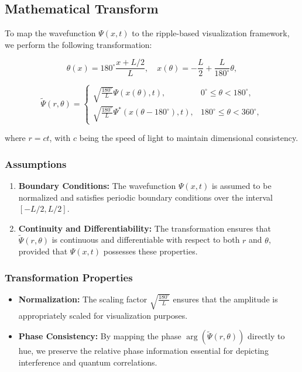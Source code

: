 \documentclass[12pt]{article}
\begin{document}
\subsection{Mathematical Transform}
To map the wavefunction \(\Psi(x,t)\) to the ripple-based visualization framework, we perform the following transformation:

\[
\theta(x) = 180^\circ \frac{x + L/2}{L}, \quad x(\theta) = -\frac{L}{2} + \frac{L}{180^\circ}\theta,
\]

\[
\tilde{\Psi}(r, \theta) = 
\begin{cases}
\sqrt{\frac{180^\circ}{L}} \Psi(x(\theta), t), & 0^\circ \leq \theta < 180^\circ, \\
\sqrt{\frac{180^\circ}{L}} \Psi^*(x(\theta - 180^\circ), t), & 180^\circ \leq \theta < 360^\circ,
\end{cases}
\]

where \(r = ct\), with \(c\) being the speed of light to maintain dimensional consistency.

\subsubsection{Assumptions}
\begin{enumerate}
    \item \textbf{Boundary Conditions:} The wavefunction \(\Psi(x,t)\) is assumed to be normalized and satisfies periodic boundary conditions over the interval \([-L/2, L/2]\).
    \item \textbf{Continuity and Differentiability:} The transformation ensures that \(\tilde{\Psi}(r, \theta)\) is continuous and differentiable with respect to both \(r\) and \(\theta\), provided that \(\Psi(x,t)\) possesses these properties.
\end{enumerate}

\subsubsection{Transformation Properties}
\begin{itemize}
    \item \textbf{Normalization:} The scaling factor \(\sqrt{\frac{180^\circ}{L}}\) ensures that the amplitude is appropriately scaled for visualization purposes.
    \item \textbf{Phase Consistency:} By mapping the phase \(\arg(\tilde{\Psi}(r, \theta))\) directly to hue, we preserve the relative phase information essential for depicting interference and quantum correlations.
\end{itemize}
\end{document}
